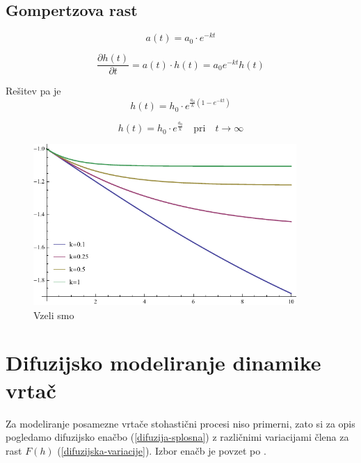 \documentclass[a4paper, oneside, 12pt]{book}
\begin{document}
          \subsection{Gompertzova rast}

          \begin{equation}
            a(t) = a_0 \cdot e^{- k t}
          \end{equation}

          \begin{equation}
            \frac{\partial h(t)}{\partial t} = a(t) \cdot h(t) = a_0 e^{ -k t} h(t)
          \end{equation}

          Rešitev pa je
          \begin{equation}
            h(t) = h_0 \cdot e^{\frac{a_0}{k}(1-e^{-kt})}
          \end{equation}

          \begin{equation}
            h(t) = h_0 \cdot e^{\frac{a_0}{k}} \quad \text{pri} \quad t \rightarrow \infty
          \end{equation}

            \begin{figure}[H]
              \begin{center}
                \includegraphics[width=10cm]{slike/gompertzova-rast}
              \end{center}
              \caption{Vzeli smo }
              \label{fig:gompertzova-rast}
            \end{figure}

            \section{Difuzijsko modeliranje dinamike vrtač}

            Za modeliranje posamezne vrtače stohastični procesi niso primerni, zato si za opis pogledamo difuzijsko enačbo (\ref{difuzija-splosna}) z različnimi variacijami člena za rast $F(h)$ (\ref{difuzijska-variacije}). Izbor enačb je povzet po \cite{kandler2010population}.
\end{document}
